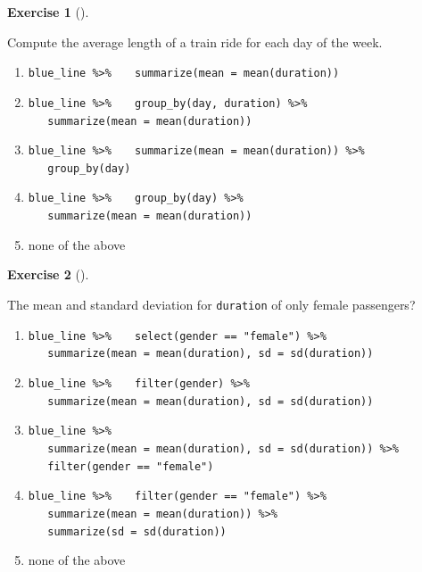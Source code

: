 \documentclass[
  letterpaper,
  DIV=11,
  numbers=noendperiod]{scrreprt}
\theoremstyle{definition}
\newtheorem{exercise}{Exercise}[chapter]
\theoremstyle{remark}
\begin{document}
\begin{exercise}[]\protect\hypertarget{exr-ch03-c09}{}\label{exr-ch03-c09}

Compute the average length of a train ride for each day of the week.

\begin{enumerate}
\def\labelenumi{\alph{enumi})}
\item
  \texttt{blue\_line\ \%\textgreater{}\%}
  \texttt{~~~summarize(mean\ =\ mean(duration))}
\item
  \texttt{blue\_line\ \%\textgreater{}\%}
  \texttt{~~~group\_by(day,\ duration)\ \%\textgreater{}\%}
  \texttt{~~~summarize(mean\ =\ mean(duration))}
\item
  \texttt{blue\_line\ \%\textgreater{}\%}
  \texttt{~~~summarize(mean\ =\ mean(duration))\ \%\textgreater{}\%}
  \texttt{~~~group\_by(day)}
\item
  \texttt{blue\_line\ \%\textgreater{}\%}
  \texttt{~~~group\_by(day)\ \%\textgreater{}\%}
  \texttt{~~~summarize(mean\ =\ mean(duration))}
\item
  none of the above
\end{enumerate}

\end{exercise}

\begin{exercise}[]\protect\hypertarget{exr-ch03-c10}{}\label{exr-ch03-c10}

The mean and standard deviation for \texttt{duration} of only female
passengers?

\begin{enumerate}
\def\labelenumi{\alph{enumi})}
\item
  \texttt{blue\_line\ \%\textgreater{}\%}
  \texttt{~~~select(gender\ ==\ "female")\ \%\textgreater{}\%}
  \texttt{~~~summarize(mean\ =\ mean(duration),\ sd\ =\ sd(duration))}
\item
  \texttt{blue\_line\ \%\textgreater{}\%}
  \texttt{~~~filter(gender)\ \%\textgreater{}\%}
  \texttt{~~~summarize(mean\ =\ mean(duration),\ sd\ =\ sd(duration))}
\item
  \texttt{blue\_line\ \%\textgreater{}\%}
  \texttt{~~~summarize(mean\ =\ mean(duration),\ sd\ =\ sd(duration))\ \%\textgreater{}\%}
  \texttt{~~~filter(gender\ ==\ "female")}
\item
  \texttt{blue\_line\ \%\textgreater{}\%}
  \texttt{~~~filter(gender\ ==\ "female")\ \%\textgreater{}\%}
  \texttt{~~~summarize(mean\ =\ mean(duration))\ \%\textgreater{}\%}
  \texttt{~~~summarize(sd\ =\ sd(duration))}
\item
  none of the above
\end{enumerate}

\end{exercise}
\end{document}
